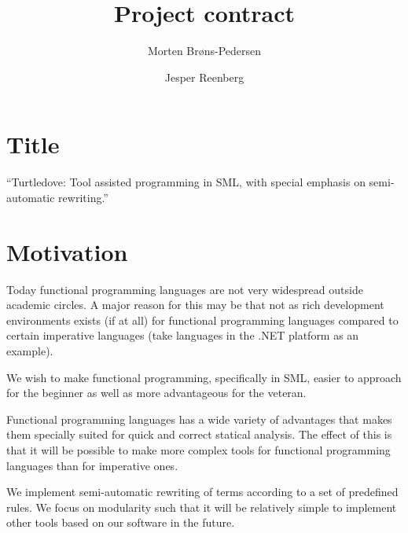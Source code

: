 \documentclass[a4paper,oneside]{article}
\author{Morten Brøns-Pedersen \and Jesper Reenberg}
\title{Project contract}
\begin{document}
\maketitle


\section{Title}
``Turtledove: Tool assisted programming in SML, with special emphasis on semi-automatic
rewriting.''

\section{Motivation}
Today functional programming languages are not very widespread outside academic circles. A major
reason for this may be that not as rich development environments exists (if at all) for functional
programming languages compared to certain imperative languages (take languages in the .NET platform
as an example).

We wish to make functional programming, specifically in SML, easier to approach for the beginner as
well as more advantageous for the veteran.

Functional programming languages has a wide variety of advantages that makes them specially suited
for quick and correct statical analysis. The effect of this is that it will be possible to make more
complex tools for functional programming languages than for imperative ones.

We implement semi-automatic rewriting of terms according to a set of predefined rules. We focus on
modularity such that it will be relatively simple to implement other tools based on our software in
the future.


\end{document}

